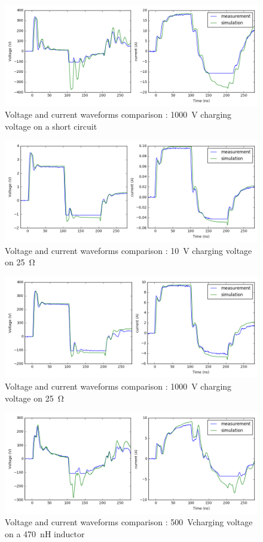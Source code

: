 \begin{figure}[!h]
  \centering
  \includegraphics[width=\textwidth]{src/2/figures/tlp_comparison_short_1000V.png}
  \caption{Voltage and current waveforms comparison : \SI{1000}{\volt} charging voltage on a short circuit}
  \label{fig:comparison-tlp-short-1000V}
\end{figure}

\begin{figure}[!h]
  \centering
  \includegraphics[width=\textwidth]{src/2/figures/tlp_comparison_R25_10V.png}
  \caption{Voltage and current waveforms comparison : \SI{10}{\volt} charging voltage on \SI{25}{\ohm}}
  \label{fig:comparison-tlp-load-10v}
\end{figure}

\begin{figure}[!h]
  \centering
  \includegraphics[width=\textwidth]{src/2/figures/tlp_comparison_R25_1000V.png}
  \caption{Voltage and current waveforms comparison : \SI{1000}{\volt} charging voltage on \SI{25}{\ohm}}
  \label{fig:comparison-tlp-load-1000v}
\end{figure}

\begin{figure}[!h]
  \centering
  \includegraphics[width=\textwidth]{src/2/figures/tlp_comparison_470nH_500V.png}
  \caption{Voltage and current waveforms comparison : \SI{500}{\volt}charging voltage on a \SI{470}{\nano\henry} inductor}
  \label{fig:comparison-tlp-inductor}
\end{figure}
